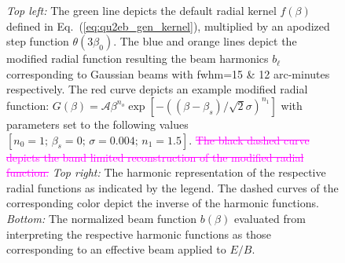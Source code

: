 \documentclass[a4paper,11pt]{article}
\def\eq#1{{Eq.~(\ref{#1})}}
\newcommand{\st}{\sout}
\newcommand{\addtext}{\textcolor{magenta}  }
\begin{document}
\begin{figure}[!t] 
\centering
{}
\caption{\textit{Top left:} The green line depicts the default radial kernel $f(\beta)$ defined in \eq{eq:qu2eb_gen_kernel}, multiplied by an apodized step function $\theta(3 \beta_0)$. The blue and orange lines depict the modified radial function resulting the beam harmonics $b_{\ell}$ corresponding to Gaussian beams with fwhm=15 \& 12 arc-minutes respectively. The red curve depicts an example modified radial function: $G(\beta)=\mathcal{A} \beta^{n_o} \exp{\left[ -\left( {(\beta-\beta_s)}{/\sqrt{2} \sigma} \right)^{n_1} \right]}$ with parameters set to the following values $[n_0=1;\, \beta_s=0 ;\, \sigma = 0.004 ;\, n_1=1.5]$.  \addtext{\st{The black dashed curve depicts the band limited reconstruction of the modified radial function.}} \textit{Top right:} The harmonic representation of the respective radial functions as indicated by the legend. The dashed curves of the corresponding color depict the inverse of the harmonic functions. \textit{Bottom:}  The normalized beam function $b(\beta)$ evaluated from interpreting the respective harmonic functions as those corresponding to an effective beam applied to $E/B$. }
\label{fig:example_gbeta}
\end{figure}
%
\end{document}
